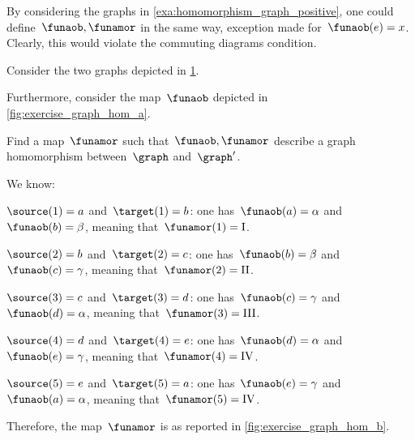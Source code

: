 \begin{example}[Counterexample]
    By considering the graphs in \cref{exa:homomorphism_graph_positive}, one could define~$\funaob,\funamor$ in the same way, exception made for~$\funaob(e)=x$.
    Clearly, this would violate the commuting diagrams condition.
\end{example}

\begin{exercise}
    Consider the two graphs depicted in \cref{fig:ex_graph_hom}.
    \begin{figure}[h]
        \centering
        \caption{
            \label{fig:ex_graph_hom}}
    \end{figure}
    \begin{marginfigure}
        \centering
        \caption{}
        \label{fig:exercise_graph_hom_a}
    \end{marginfigure}
    Furthermore, consider the map~$\funaob$ depicted in \cref{fig:exercise_graph_hom_a}.

    Find a map~$\funamor$ such that~$\funaob,\funamor$ describe a graph homomorphism between~$\graph$ and~$\graph'$.
\end{exercise}

\begin{solution}
    We know:
    \begin{compactitem}
        \item $\source(1)=a$ and~$\target(1)=b$: one has~$\funaob(a)=\alpha$ and~$\funaob(b)=\beta$, meaning that~$\funamor(1)=\text{I}$.
        \item $\source(2)=b$ and~$\target(2)=c$: one has~$\funaob(b)=\beta$ and~$\funaob(c)=\gamma$, meaning that~$\funamor(2)=\text{II}$.
        \item $\source(3)=c$ and~$\target(3)=d$: one has~$\funaob(c)=\gamma$ and~$\funaob(d)=\alpha$, meaning that~$\funamor(3)=\text{III}$.
        \item $\source(4)=d$ and~$\target(4)=e$: one has~$\funaob(d)=\alpha$ and~$\funaob(e)=\gamma$, meaning that~$\funamor(4)=\text{IV}$.
        \item $\source(5)=e$ and~$\target(5)=a$: one has~$\funaob(e)=\gamma$ and~$\funaob(a)=\alpha$, meaning that~$\funamor(5)=\text{IV}$.
    \end{compactitem}
    Therefore, the map~$\funamor$ is as reported in \cref{fig:exercise_graph_hom_b}.

    \begin{marginfigure}
        \centering
        \caption{}
        \label{fig:exercise_graph_hom_b}
    \end{marginfigure}
\end{solution}

